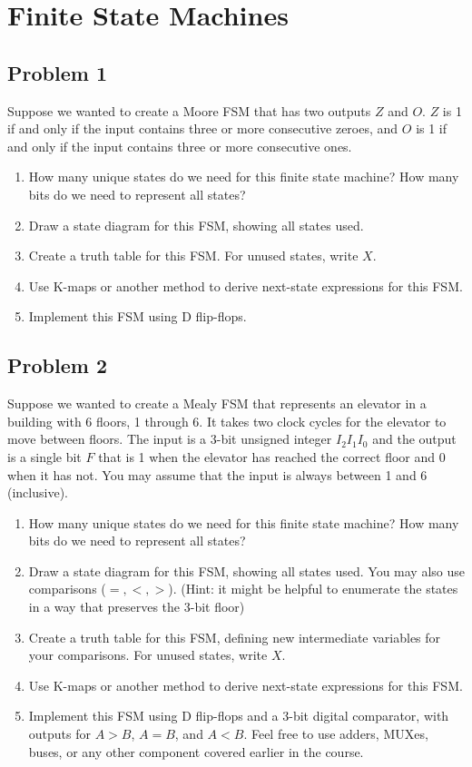\documentclass{article}
\begin{document}
\newpage
\section*{Finite State Machines}
\subsection*{Problem 1}

Suppose we wanted to create a Moore FSM that has two outputs $Z$ and $O$. $Z$ is 1 if and only if the input contains three or more consecutive zeroes, and $O$ is 1 if and only if the input contains three or more consecutive ones.

\begin{enumerate}[label=\alph*.]
\item How many unique states do we need for this finite state machine? How many bits do we need to represent all states?
\item Draw a state diagram for this FSM, showing all states used.
\item Create a truth table for this FSM. For unused states, write $X$.
\item Use K-maps or another method to derive next-state expressions for this FSM.
\item Implement this FSM using D flip-flops.
\end{enumerate}

\subsection*{Problem 2}

Suppose we wanted to create a Mealy FSM that represents an elevator in a building with 6 floors, 1 through 6. It takes two clock cycles for the elevator to move between floors. The input is a 3-bit unsigned integer $I_2I_1I_0$ and the output is a single bit $F$ that is 1 when the elevator has reached the correct floor and 0 when it has not. You may assume that the input is always between 1 and 6 (inclusive).

\begin{enumerate}[label=\alph*.]
\item How many unique states do we need for this finite state machine? How many bits do we need to represent all states?
\item Draw a state diagram for this FSM, showing all states used. You may also use comparisons ($=, <, >$). (Hint: it might be helpful to enumerate the states in a way that preserves the 3-bit floor)
\item Create a truth table for this FSM, defining new intermediate variables for your comparisons. For unused states, write $X$.
\item Use K-maps or another method to derive next-state expressions for this FSM.
\item Implement this FSM using D flip-flops and a 3-bit digital comparator, with outputs for $A > B$, $A = B$, and $A < B$. Feel free to use adders, MUXes, buses, or any other component covered earlier in the course.
\end{enumerate}
\end{document}
